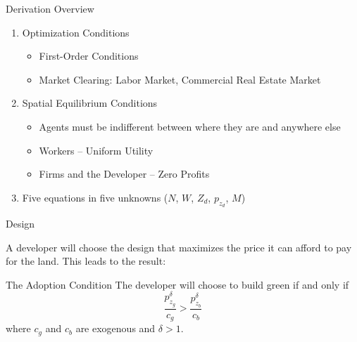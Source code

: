 \documentclass[11pt]{beamer}
\begin{document}
\begin{frame}{Derivation Overview}

\begin{enumerate}
\item Optimization Conditions
\begin{itemize}
	\item First-Order Conditions
	\item Market Clearing: Labor Market, Commercial Real Estate Market
\end{itemize}

\vfill
\item Spatial Equilibrium Conditions
\begin{itemize}
	\item Agents must be indifferent between where they are and anywhere else
	\item Workers -- Uniform Utility
	\item Firms and the Developer -- Zero Profits
\end{itemize}

\vfill
\item Five equations in five unknowns ($N$, $W$, $Z_d$, $p_{z_d}$, $M$)
\end{enumerate}


\end{frame}



\begin{frame}{Design}

A developer will choose the design that maximizes the price it can afford to pay for the land. This leads to the result:

\vfill
\begin{block}{The Adoption Condition}
The developer will choose to build green if and only if
$$\frac{p_{z_g}^\delta}{c_g} > \frac{p_{z_b}^\delta}{c_b}$$
where $c_g$ and $c_b$ are exogenous and $\delta >1$.
\end{block}


\end{frame}
\end{document}
